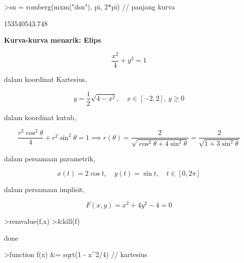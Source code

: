 \documentclass[a4paper,11pt,oneside,enabledeprecatedfontcommands]{scrbook}
\newenvironment{eulernotebook}{}{}
\newenvironment{eulercomment}{\par\medskip\noindent}{\par\medskip}
\newenvironment{eulerformula}{}{}
\begin{document}
\begin{eulernotebook}
\begin{eulerformula}
\[\]
\end{eulerformula}
\begin{eulerprompt}
>sn = romberg(mxm("dsn"), pi, 2*pi) // panjang kurva
\end{eulerprompt}
\begin{euleroutput}
  153540543.748
\end{euleroutput}
\begin{eulercomment}
\textbf{Kurva-kurva menarik: Elips}
\end{eulercomment}
\begin{eulerformula}
\[
\frac{x^2}{4}+y^2=1
\]
\end{eulerformula}
\begin{eulercomment}
dalam koordinat Kartesius,
\end{eulercomment}
\begin{eulerformula}
\[
y =\frac{1}{2}\sqrt{4 - x^2}, \quad x \in [-2, 2], \, y \ge 0
\]
\end{eulerformula}
\begin{eulercomment}
dalam koordinat kutub,
\end{eulercomment}
\begin{eulerformula}
\[
\frac{r^2\cos^2\theta}{4} + r^2\sin^2\theta = 1 \implies r(\theta) = \frac{2}{\sqrt{\cos^2\theta + 4\sin^2\theta}} = \frac{2}{\sqrt{1 + 3\sin^2\theta}}
\]
\end{eulerformula}
\begin{eulercomment}
dalam persamaan parametrik,
\end{eulercomment}
\begin{eulerformula}
\[
x(t) = 2\cos t, \quad y(t) = \sin t, \quad t \in [0, 2\pi]
\]
\end{eulerformula}
\begin{eulercomment}
dalam persamaan implisit,
\end{eulercomment}
\begin{eulerformula}
\[
F(x,y)=x^2+4y^2-4=0
\]
\end{eulerformula}
\begin{eulerprompt}
>remvalue(f,x)
>&kill(f)
\end{eulerprompt}
\begin{euleroutput}
  
                                                  done
  
\end{euleroutput}
\begin{eulerprompt}
>function f(x) &= sqrt(1 - x^2/4) // kartesius
\end{eulerprompt}
\begin{euleroutput}
  

\end{euleroutput}
\end{eulernotebook}
\end{document}
